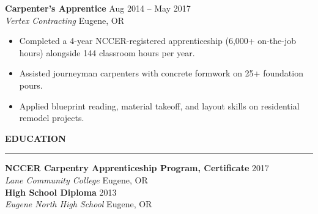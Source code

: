 \documentclass[10pt]{article}
\newcommand{\sectionrule}[1]{%
  \vspace{2pt}
  {\color{primary}\bfseries\large #1}\\[-4pt]
  {\color{accent}\rule{\linewidth}{1.3pt}}
  \vspace{0pt}
}
\newcommand{\jobentry}[4]{%
  \vspace{1pt}
  \textbf{\color{primary}#1} \hfill {\color{graytext}\small #4}\\
  \textit{\color{accent}#2} \hfill {\color{graytext}\small #3}\\[0pt]
}
\begin{document}
\jobentry{Carpenter's Apprentice}{Vertex Contracting}{Eugene, OR}{Aug 2014 -- May 2017}
\begin{itemize}
  \item Completed a 4-year NCCER-registered apprenticeship (6,000+ on-the-job hours) alongside 144 classroom hours per year.
  \item Assisted journeyman carpenters with concrete formwork on 25+ foundation pours.
  \item Applied blueprint reading, material takeoff, and layout skills on residential remodel projects.
\end{itemize}

\sectionrule{EDUCATION}
\jobentry{NCCER Carpentry Apprenticeship Program, Certificate}{Lane Community College}{Eugene, OR}{2017}
\jobentry{High School Diploma}{Eugene North High School}{Eugene, OR}{2013}
\end{document}
